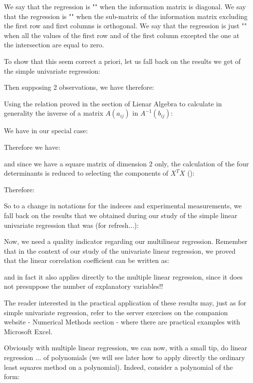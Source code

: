 	\begin{tcolorbox}[title=Remark,colframe=black,arc=10pt]
	We say that the regression is "" when the information matrix is diagonal. We say that the regression is "" when the sub-matrix of the information matrix excluding the first row and first columns is orthogonal. We say that the regression is just "" when all the values of the first row and of the first column excepted the one at the intersection are equal to zero.
	\end{tcolorbox}	
	To show that this seem correct a priori, let us fall back on the results we get of the simple univariate regression:
	
	Then supposing 2 observations, we have therefore:
	
	Using the relation proved in the section of Lienar Algebra to calculate in generality the inverse of a matrix $A(a_{ij})$ in $A^{-1}(b_{ij})$:
	
	We have in our special case:
		
	Therefore we have:
	
	and since we have a square matrix of dimension $2$ only, the calculation of the four determinants is reduced to selecting the components of $X^TX$ ():
	
	Therefore:
	
	So to a change in notations for the indeces and experimental measurements, we fall back on the results that we obtained during our study of the simple linear univariate regression that was (for refresh...):
	
	Now, we need a quality indicator regarding our multilinear regression. Remember that in the context of our study of the univariate linear regression, we proved that the linear correlation coefficient can be written as:
	
	and in fact it also applies directly to the multiple linear regression, since it does not presuppose the number of explanatory variables!!
	
	\begin{tcolorbox}[title=Remark,colframe=black,arc=10pt]
	The reader interested in the practical application of these results may, just as for simple univariate regression, refer to the server exercises on the companion website - Numerical Methods section - where there are practical examples with Microsoft Excel.
	\end{tcolorbox}	
	Obviously with multiple linear regression, we can now, with a small tip, do linear regression ... of polynomials (we will see later how to apply directly the ordinary least squares method on a polynomial). Indeed, consider a polynomial of the form:
	
